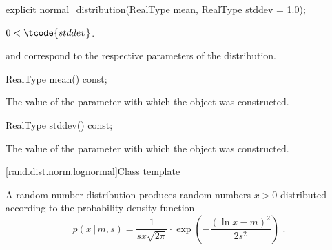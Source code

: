 \begin{indexed}{}
\begin{itemdecl}
explicit normal_distribution(RealType mean, RealType stddev = 1.0);
\end{itemdecl}
\end{indexed}

\begin{itemdescr}
\pnum
\expects
$0 < \tcode{stddev}$.

\pnum
\remarks
{} and 
correspond to the respective parameters of the distribution.
\end{itemdescr}

\begin{indexed}{}
\begin{itemdecl}
RealType mean() const;
\end{itemdecl}
\end{indexed}

\begin{itemdescr}
\pnum
\returns
The value of the  parameter
 with which the object was constructed.
\end{itemdescr}

\begin{indexed}{}
\begin{itemdecl}
RealType stddev() const;
\end{itemdecl}
\end{indexed}

\begin{itemdescr}
\pnum
\returns
The value of the  parameter
 with which the object was constructed.
\end{itemdescr}


[rand.dist.norm.lognormal]{Class template }%
%
%

\pnum
A  random number distribution
produces random numbers $x > 0$
distributed according to
the probability density function%
%
%
\[ p(x\,|\,m,s) = \frac{1}{s x \sqrt{2 \pi}}
     \cdot \exp{\left(-\frac{(\ln{x} - m)^2}{2 s^2}\right)}
     \text{ .} \]

